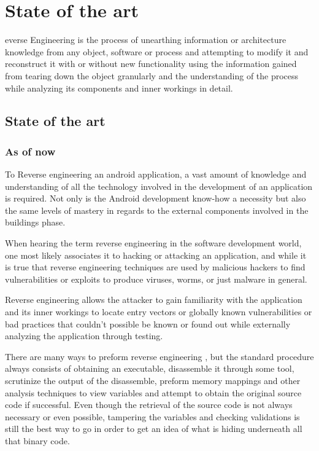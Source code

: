 %
%
\let\textcircled=\pgftextcircled
\chapter{State of the art}
\label{chap:stateOfTheArt}

everse Engineering is the process of unearthing information or architecture knowledge from any object, software or process and attempting to modify it and reconstruct it with or without new functionality using the information gained from tearing down the object granularly and the understanding of the process while analyzing its components and inner workings in detail.

\section{State of the art}
\label{sec:sec01}

\subsection{As of now}

To Reverse engineering an android application, a vast amount of knowledge  and understanding of all the technology involved in the development of an application is required. Not only is the Android development know-how a necessity but also the same levels of mastery in regards to the external components involved in the buildings phase. 

When hearing the term reverse engineering in the software development world, one most likely associates it to hacking or attacking an application, and while it is true that reverse engineering techniques are used by malicious hackers to find vulnerabilities or exploits to produce viruses, worms, or just malware in general.

Reverse engineering allows the  attacker to gain familiarity with the application and its inner workings to locate entry vectors or globally known vulnerabilities or bad practices that couldn't possible be known or found out while externally analyzing the application through testing.

There are many ways to preform reverse engineering , but the standard procedure always consists of obtaining an executable, disassemble it through some tool, scrutinize the output of the disassemble, preform memory mappings and other analysis techniques to view variables and attempt to obtain the original source code if successful. Even though the retrieval of the source code is not always necessary or even possible, tampering the variables and checking validations is still the best way to go in order to get an idea of what is hiding underneath all that binary code.

